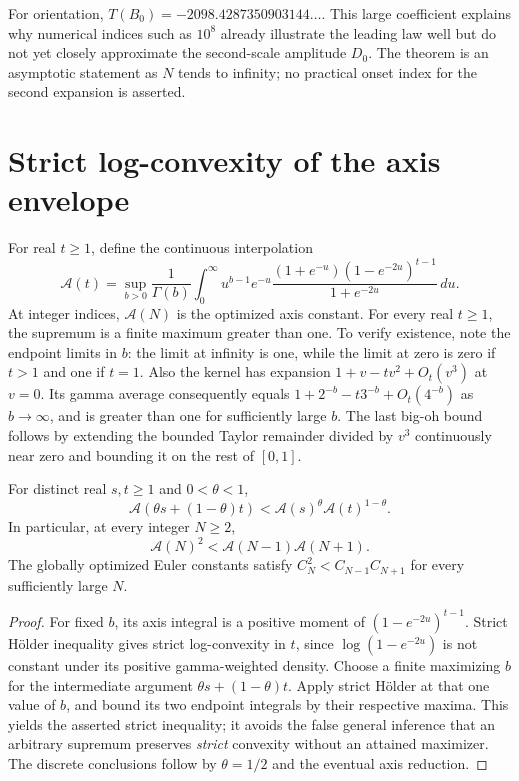 For orientation, $T(B_0)=-2098.4287350903144\ldots$.
This large coefficient explains why numerical indices such as $10^8$
already illustrate the leading law well but do not yet closely
approximate the second-scale amplitude $D_0$.  The theorem is an
asymptotic statement as $N$ tends to infinity; no practical onset
index for the second expansion is asserted.

\section{Strict log-convexity of the axis envelope}
\label{eul:sec:axis-logconvex}
For real $t\geq1$, define the continuous interpolation
\[
 \mathcal A(t)=\sup_{b>0}\frac1{\Gamma(b)}\int_0^\infty
 u^{b-1}e^{-u}
 \frac{(1+e^{-u})(1-e^{-2u})^{t-1}}{1+e^{-2u}}\,du.
\]
At integer indices, $\mathcal A(N)$ is the optimized axis constant.
For every real $t\geq1$, the supremum is a finite maximum greater
than one.  To verify existence, note the endpoint limits in $b$:
the limit at infinity is one, while the limit at zero is zero if
$t>1$ and one if $t=1$.  Also the kernel has expansion
$1+v-tv^2+O_t(v^3)$ at $v=0$.  Its gamma average consequently equals
$1+2^{-b}-t3^{-b}+O_t(4^{-b})$ as $b\to\infty$, and is greater
than one for sufficiently large $b$.
The last big-oh bound follows by extending the bounded Taylor
remainder divided by $v^3$ continuously near zero and bounding it
on the rest of $[0,1]$.

\begin{theorem}
\label{eul:thm:axis-logconvex}
For distinct real $s,t\geq1$ and $0<\theta<1$,
\[
 \mathcal A(\theta s+(1-\theta)t)
     <\mathcal A(s)^\theta\mathcal A(t)^{1-\theta}.
\]
In particular, at every integer $N\geq2$,
\[
 \mathcal A(N)^2<\mathcal A(N-1)\mathcal A(N+1).
\]
The globally optimized Euler constants satisfy
$C_N^2<C_{N-1}C_{N+1}$ for every sufficiently large $N$.
\end{theorem}
\begin{proof}
For fixed $b$, its axis integral is a positive moment of
$(1-e^{-2u})^{t-1}$.  Strict H\"older inequality gives strict
log-convexity in $t$, since $\log(1-e^{-2u})$ is not constant
under its positive gamma-weighted density.
Choose a finite maximizing $b$ for the intermediate argument
$\theta s+(1-\theta)t$.  Apply strict H\"older at that one value
of $b$, and bound its two endpoint integrals by their respective
maxima.  This yields the asserted strict inequality; it avoids
the false general inference that an arbitrary supremum preserves
\emph{strict} convexity without an attained maximizer.
The discrete conclusions follow by $\theta=1/2$ and the eventual
axis reduction.
\end{proof}
